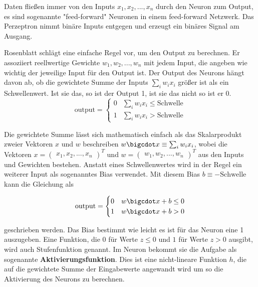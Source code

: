 Daten fließen immer von den Inputs $x_1, x_2, ..., x_n$ durch den Neuron zum Output, es sind sogenannte "feed-forward" Neuronen in einem feed-forward Netzwerk. Das Perzeptron nimmt binäre Inputs entgegen und erzeugt ein binäres Signal am Ausgang.
\par
Rosenblatt schlägt eine einfache Regel vor, um den Output zu berechnen. Er assoziiert reellwertige Gewichte $w_1,w_2,...,w_n$ mit jedem Input, die angeben wie wichtig der jeweilige Input für den Output ist. Der Output des Neurons hängt davon ab, ob die gewichtete Summe der Inputs $\sum_{i} w_i x_i$ größer ist als ein Schwellenwert. Ist sie das, so ist der Output 1, ist sie das nicht so ist er 0.
\begin{equation}
\textrm{output} = \begin{cases} 0 & \sum_{i} w_i x_i \le \textrm{Schwelle}\\
1 & \sum_{i} w_i x_i > \textrm{Schwelle}
 \end{cases}
\end{equation}

Die gewichtete Summe lässt sich mathematisch einfach als das Skalarprodukt zweier Vektoren $x$ und $w$ beschreiben $w \bigcdot x \equiv \sum_{i} w_i x_i$, wobei die Vektoren $x = \begin{pmatrix}x_1, x_2, ..., x_n\end{pmatrix}^T$ und $w = \begin{pmatrix}w_1, w_2, ..., w_n\end{pmatrix}^T$ aus den Inputs und Gewichten bestehen. Anstatt eines Schwellenwertes wird in der Regel ein weiterer Input als sogenanntes Bias verwendet. Mit diesem Bias $b \equiv -\textrm{Schwelle}$ kann die Gleichung als 

\begin{equation}
\textrm{output} = \begin{cases} 0 & w \bigcdot x + b \le 0\\
1 & w \bigcdot x + b > 0
\end{cases}
\end{equation}

geschrieben werden. Das Bias bestimmt wie leicht es ist für das Neuron eine 1 auszugeben. Eine Funktion, die $0$ für Werte $z \le 0$ und $1$ für Werte $z > 0$ ausgibt, wird auch Stufenfunktion genannt. Im Neuron bekommt sie die Aufgabe als sogenannte \textbf{Aktivierungsfunktion}. Dies ist eine nicht-lineare Funktion $h$, die auf die gewichtete Summe der Eingabewerte angewandt wird um so die Aktivierung des Neurons zu berechnen.

